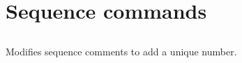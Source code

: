 
\section{Sequence commands}


\subsection[seq\_comment]{  }



Modifies sequence comments to add a unique number.


